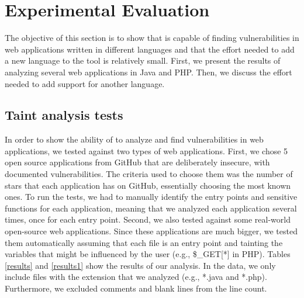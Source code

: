 \section{Experimental Evaluation}

The objective of this section is to show that \toolname{} is capable of finding vulnerabilities in web applications written in different languages and that the effort needed to add a new language to the tool is relatively small. First, we present the results of analyzing several web applications in Java and PHP. Then, we discuss the effort needed to add support for another language.

\subsection{Taint analysis tests}
In order to show the ability of \toolname{} to analyze and find vulnerabilities in web applications, we tested \toolname{} against two types of web applications. First, we chose 5 open source applications from GitHub that are deliberately insecure, with documented vulnerabilities. The criteria used to choose them was the number of stars that each application has on GitHub, essentially choosing the most known ones. To run the tests, we had to manually identify the entry points and sensitive functions for each application, meaning that we analyzed each application several times, once for each entry point. Second, we also tested \toolname{} against some real-world open-source web applications. Since these applications are much bigger, we tested them automatically assuming that each file is an entry point and tainting the variables that might be influenced by the user (e.g., \$\_GET[*] in PHP). Tables \ref{results} and \ref{results1} show the results of our analysis. In the data, we only include files with the extension that we analyzed (e.g., *.java and *.php). Furthermore, we excluded comments and blank lines from the line count. 


